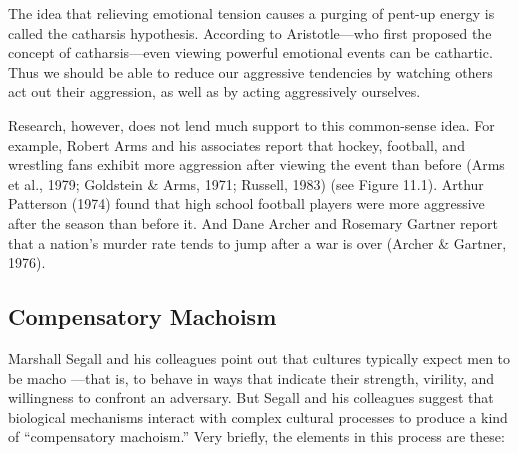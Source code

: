 \documentclass[
]{book}
\begin{document}
The idea that relieving emotional tension causes a purging of pent-up energy is called the catharsis hypothesis. According to Aristotle---who first proposed the concept of catharsis---even viewing powerful emotional events can be cathartic. Thus we should be able to reduce our aggressive tendencies by watching others act out their aggression, as well as by acting aggressively ourselves.

Research, however, does not lend much support to this common-sense idea. For example, Robert Arms and his associates report that hockey, football, and wrestling fans exhibit more aggression after viewing the event than before (Arms et al., 1979; Goldstein \& Arms, 1971; Russell, 1983) (see Figure 11.1). Arthur Patterson (1974) found that high school football players were more aggressive after the season than before it. And Dane Archer and Rosemary Gartner report that a nation's murder rate tends to jump after a war is over (Archer \& Gartner, 1976).

\hypertarget{compensatory-machoism}{%
\subsection*{Compensatory Machoism}\label{compensatory-machoism}}

Marshall Segall and his colleagues point out that cultures typically expect men to be macho ---that is, to behave in ways that indicate their strength, virility, and willingness to confront an adversary. But Segall and his colleagues suggest that biological mechanisms interact with complex cultural processes to produce a kind of ``compensatory machoism.'' Very briefly, the elements in this process are these:
\end{document}
